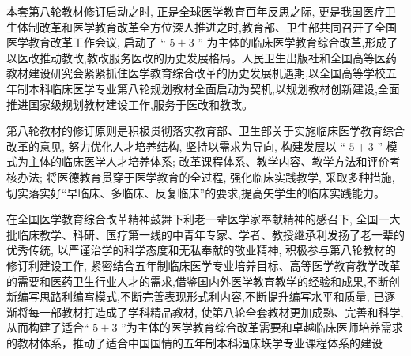 \documentclass[10pt]{article}
\begin{document}
本套第八轮教材修订启动之时, 正是全球医学教育百年反思之际, 更是我国医疗卫生体制改革和医学教育改革全方位深人推进之时,教育部、卫生部共同召开了全国医学教育改革工作会议, 启动了 “ $5+3$ ” 为主体的临床医学教育综合改革,形成了以医改推动教改,教改服务医改的历史发展格局。人民卫生出版社和全国高等医药教材建设研究会紧紧抓住医学教育综合改革的历史发展机遇期,以全国高等学校五年制本科临床医学专业第八轮规划教材全面启动为契机,以规划教材创新建设,全面推进国家级规划教材建设工作,服务于医改和教改。

第八轮教材的修订原则是积极贯彻落实教育部、卫生部关于实施临床医学教育综合改革的意见, 努力优化人才培养结构, 坚持以需求为导向, 构建发展以 “ $5+3$ ” 模式为主体的临床医学人才培养体系; 改革课程体系、教学内容、教学方法和评价考核办法; 将医德教育贯穿于医学教育的全过程, 强化临床实践教学, 采取多种措施, 切实落实好“早临床、多临床、反复临床”的要求,提高矢学生的临床实践能力。

在全国医学教育综合改革精神鼓舞下利老一辈医学家奉献精神的感召下, 全国一大批临床教学、科研、匤疗第一线的中青年专家、学者、教授继承利发扬了老一辈的优秀传统, 以严谨治学的科学态度和无私奉献的敬业精神, 积极参与第八轮教材的修订利建设工作, 紧密结合五年制临床医学专业培养目标、高等医学教育教学改革的需要和医药卫生行业人才的需求,借鉴国内外医学教育教学的经验和成果,不断创新编写思路利编㝍模式,不断完善表现形式利内容,不断提升编写水平和质量, 已逐渐将每一部教材打造成了学科精品教材, 使第八轮全套教材更加成熟、完善和科学, 从而构建了适合“ $5+3$ ”为主体的医学教育综合改革需要和卓越临床医师培养需求的教材体系，推动了适合中国国情的五年制本科湢床垁学专业课程体系的建设
\end{document}
